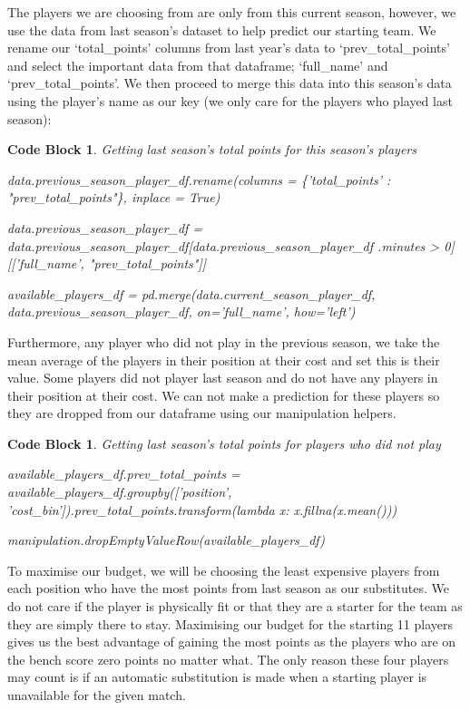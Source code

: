 \documentclass[12pt, a4paper, oneside]{book}
\newtheorem{codeblock}[theorem]{Code Block}
\numberwithin{equation}{section}
\begin{document}
The players we are choosing from are only from this current season, however, we use the data from last season's dataset to help predict our starting team. We rename our `total\_points' columns from last year's data to `prev\_total\_points' and select the important data from that dataframe; `full\_name' and `prev\_total\_points'. We then proceed to merge this data into this season's data using the player's name as our key (we only care for the players who played last season):

\begin{codeblock}
  Getting last season's total points for this season's players

  data.previous\_season\_player\_df.rename(columns = \{'total\_points' : "prev\_total\_points"\}, inplace = True)
  
  data.previous\_season\_player\_df = data.previous\_season\_player\_df[data.previous\_season\_player\_df .minutes > 0][['full\_name', "prev\_total\_points"]]

  available\_players\_df = pd.merge(data.current\_season\_player\_df, data.previous\_season\_player\_df, on='full\_name', how='left')
\end{codeblock}

Furthermore, any player who did not play in the previous season, we take the mean average of the players in their position at their cost and set this is their value. Some players did not player last season and do not have any players in their position at their cost. We can not make a prediction for these players so they are dropped from our dataframe using our manipulation helpers.

\begin{codeblock}
  Getting last season's total points for players who did not play

  available\_players\_df.prev\_total\_points = available\_players\_df.groupby(['position', 'cost\_bin']).prev\_total\_points.transform(lambda x: x.fillna(x.mean()))
  
  manipulation.dropEmptyValueRow(available\_players\_df)
\end{codeblock}

To maximise our budget, we will be choosing the least expensive players from each position who have the most points from last season as our substitutes. We do not care if the player is physically fit or that they are a starter for the team as they are simply there to stay. Maximising our budget for the starting 11 players gives us the best advantage of gaining the most points as the players who are on the bench score zero points no matter what. The only reason these four players may count is if an automatic substitution is made when a starting player is unavailable for the given match.
\end{document}
